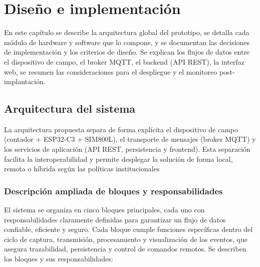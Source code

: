 \chapter{Diseño e implementación} %

\label{Chapter3}

En este capítulo se describe la arquitectura global del prototipo, se detalla cada módulo de hardware y software que lo compone, y se documentan las decisiones de implementación y los criterios de diseño. Se explican los flujos de datos entre el dispositivo de campo, el broker MQTT, el backend (API REST), la interfaz web, se resumen las consideraciones para el despliegue y el monitoreo post-implantación.


\section{Arquitectura del sistema}

La arquitectura propuesta separa de forma explícita el dispositivo de campo (contador + ESP32-C3 + SIM800L), el transporte de mensajes (broker MQTT) y los servicios de aplicación (API REST, persistencia y frontend). Esta separación facilita la interoperabilidad y permite desplegar la solución de forma local, remota o híbrida según las políticas institucionales


\subsection{Descripción ampliada de bloques y responsabilidades}

El sistema se organiza en cinco bloques principales, cada uno con responsabilidades claramente definidas para garantizar un flujo de datos confiable, eficiente y seguro. Cada bloque cumple funciones específicas dentro del ciclo de captura, transmisión, procesamiento y visualización de los eventos, que asegura trazabilidad, persistencia y control de comandos remotos. Se describen los bloques y sus responsabilidades:


